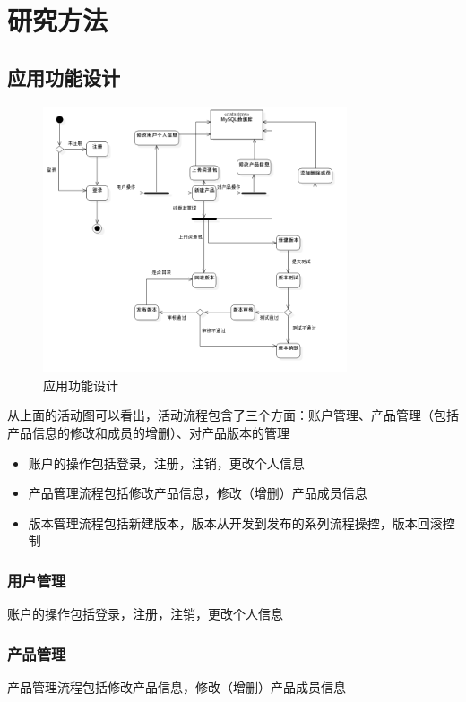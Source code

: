 \chapter{研究方法}
\label{cha:experiment}

\section{应用功能设计}
\label{sec:app_design}
\begin{figure}[h]
	\centering
	\includegraphics[width=0.8\textwidth]{image/UML/ActivityDiagram.png}
	\caption{应用功能设计}
	\label{fig:app}
\end{figure}
从上面的活动图可以看出，活动流程包含了三个方面：账户管理、产品管理（包括产品信息的修改和成员的增删）、对产品版本的管理
\begin{itemize}
	\item 账户的操作包括登录，注册，注销，更改个人信息
	\item 产品管理流程包括修改产品信息，修改（增删）产品成员信息
	\item 版本管理流程包括新建版本，版本从开发到发布的系列流程操控，版本回滚控制
\end{itemize}
\subsection{用户管理}
\label{sec:user}
账户的操作包括登录，注册，注销，更改个人信息
\subsection{产品管理}
\label{sec:product}
产品管理流程包括修改产品信息，修改（增删）产品成员信息

